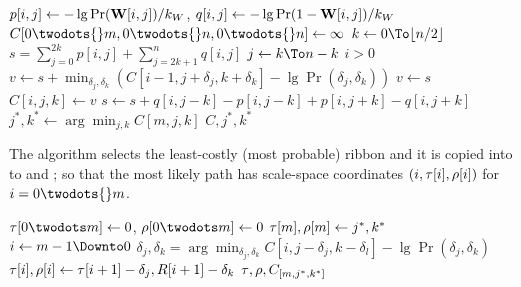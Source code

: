 \begin{codebox}
 \label{alg:segmet-ribbin}
\li $p[i,j]\gets -\lg \Pr(\mathbf{W}{}[i,j])/k_W{}$, 
          \hspace{2ex} $q[i,j] \gets -\lg \Pr(1-\mathbf{W}{}[i,j])/k_W{}$
\li $C{[0\twodots{}m, 0\twodots{}n, 0\twodots{}n]} \gets \infty$
\li {} \Do                                                \label{li:loop-slices}
\li     \For $k \gets 0 \To \lfloor n/2 \rfloor $ \Do                          \label{li:loop-radius}
\li         $s = \displaystyle{\sum_{j=0}^{2k} p[i,j] +\sum_{j=2k+1}^n  q[i, j] }$
\li         \For $j \gets k \To n-k$ \Do  \label{li:loop-center}
\li              \If $i > 0$  \Do                                              \label{li:if-has-pred}
\li              $v \gets s {+}\displaystyle{\min_{\delta_j, \delta_k}\left(  
                              C[i{-}1,j{+}\delta_j,k{+}\delta_k] -\lg \Pr(\delta_j, \delta_k)
                            \right)}$  
                               \label{li:min-from-pred}
\li              \Else $v\gets s$
                 \End
\li              $C{[i, j, k]} \gets v$                                       \label{li:dp-store}
\li              $s \gets s{+}q[i,j{-}k]{-}p[i, j{-}k]{+}p[i, j{+}k]{-}q[i,j{+}k]$ \label{li:update-s}
           \End
       \End
    \End
\li $j^*, k^* \gets \displaystyle{\arg\min_{j,k} C{[m, j, k]}}$
\li \Return $C, j^*, k^*$
\end{codebox}

The  algorithm selects the least-costly (most probable) ribbon and it is
copied into to \OutputTrajectory{} and \OutputRadius{};
so that the most likely path has scale-space coordinates $(i, \tau{}[i],
\rho{}[i])$ for $i=0\twodots{}m$.



\begin{codebox}
 \label{alg:backtrack-ribbon}
\li $\OutputTrajectory{}{[0{\twodots}m]} \gets 0$, \quad $\OutputRadius{}[0{\twodots}m] \gets 0$             
\li $\tau{}{[m]}, \rho{}{[m]} \gets j^*, k^*$ \label{li:backtrack-best-last}
\li \For $i \gets m-1 \Downto 0$ \Do
\li      $\delta_j, \delta_k = \displaystyle{\arg\min_{\delta_j,\delta_k}C{[i,j{-}\delta_j,k{-}\delta_l]}{-}\lg \Pr(\delta_j,\delta_k)}$
\li      $\tau{}{[i]}, \rho{}[i] \gets \tau{}{[i+1]}-\delta_j, R{[i+1]}-\delta_k$                                                 \label{li:backtack-choose-pred}
    \End
\li \Return $\tau{}, \rho{}, C_{[m, j^*, k^*]}$
\end{codebox}


